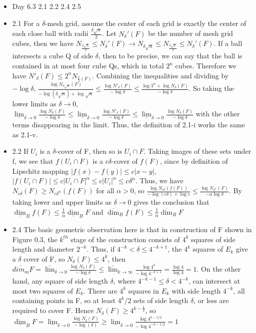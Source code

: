 \documentclass{article}
\begin{document}
\begin{itemize}
\item Day 6.3 2.1 2.2 2.4 2.5\\

\item 2.1
For a $\delta$-mesh grid, assume the center of each grid is exactly the center of each close ball with radii $\frac{\delta \sqrt{n}}{2}$. Let $N_\delta'(F)$ be the number of mesh grid cubes, then we have $N_{\frac{\delta \sqrt{n}}{2}} \leq N_\delta'(F) \rightarrow N
_{\delta \sqrt{n}} \leq N_{\frac{\delta \sqrt{n}}{2}} \leq N_\delta'(F) $. If a ball intersects a cube Q of side $\delta$, then to be precise, we can say that the ball is contained in at most four cube Qs, which in total $2^n$ cubes. Therefore we have $N'_\delta (F) \leq 2^n N_{\frac{\delta}{2}(F)}$. Combining the inequalities and dividing by $-\log \delta$, $\frac{\log N_{\delta \sqrt{n}}(F)}{-\log (\delta \sqrt{n}) + \log \sqrt{n}} \leq \frac{\log N'_\delta(F)}{-\log \delta} \leq \frac{\log 3^n + \log N_\delta(F)}{-\log \delta}$. So taking the lower limits as $\delta \rightarrow 0$, $\underline{\lim}_{\delta \rightarrow 0}\frac{\log N_\delta (F)}{-\log \delta} \leq \underline{\lim}_{\delta \rightarrow 0} \frac{\log N'_\delta(F)}{- \log \delta} \leq\underline{\lim}_{\delta \rightarrow 0}\frac{\log N_\delta (F)}{- \log \delta}$ with the other terms disappearing in the limit. Thus, the definition of 2.1-i works the same as 2.1-v. 
\item 2.2
If ${U_i}$ is a $\delta$-cover of F, then so is ${U_i \cap F}$. Taking images of these sets under f, we see that ${f(U_i \cap F)}$ is a $c\delta$-cover of $f(F)$, since by definition of Lipschitz mapping $|f(x) - f(y)| \leq c|x-y|$,  $|f(U_i \cap F)|\leq c|U_i \cap F|^\alpha\leq c|U_i|^\alpha\leq c\delta^\alpha$. Thus, we have $N_{c\delta}(F) \geq N_{c\delta^\alpha}(f(F))$ for all $\alpha > 0$, so $\frac{\log N_{c\delta}(f(F))}{-\log(c\delta)+\log c} \leq \frac{\log N_{\delta^\alpha}(F)}{-\alpha \log \delta}$. By taking lower and upper limits as $\delta \rightarrow 0$ gives the conclusion that $\underline{\dim}_B f(F) \leq \frac{1}{\alpha}\underline{\dim}_B F$ and $\overline{\dim}_B f(F) \leq \frac{1}{\alpha}\overline{\dim}_B F$
\item 2.4
The basic geometric observation here is that in construction of F shown in Figure 0.3, the $k^{th}$ stage of the construction consists of $4^k$ squares of side length and diameter $2^{-k}$. Thus, if $4^{-k} < \delta \leq 4^{-k+1}$, the $4^k$ squares of $E_k$ give a $\delta$ cover of F, so $N_\delta(F) \leq 4^k$, then $\bar{dim_m}F = \bar{\lim}_{\delta \rightarrow 0}\frac{\log N_\delta(F)}{-\log \delta} \leq \bar{\lim}_{k \rightarrow \infty} \frac{\log 4^k}{-\log 4^{-k+1}} = \frac{\log 4}{\log 4} = 1$. On the other hand, any square of side length $\delta$, where $4^{-k-1} \leq \delta < 4^{-k}$, can intersect at most two squares of $E_k$. There are $4^k$ squares in $E_k$ with side length $4^{-k}$, all containing points in F, so at least $4^k/2$ sets of side length $\delta$, or less are required to cover F. Hence $N_\delta(F) \geq 4^{k-\frac{1}{2}}$, so $\underline{\dim}_BF = \underline{\lim}_{\delta \rightarrow 0}\frac{\log N_\delta(F)}{-\log(\delta)} \geq \underline{\lim}_{\delta \rightarrow 0} \frac{\log 4^{k - 1/2}}{-\log 4^{-k - 1/2}} = 1$   

\end{itemize}
\end{document}
